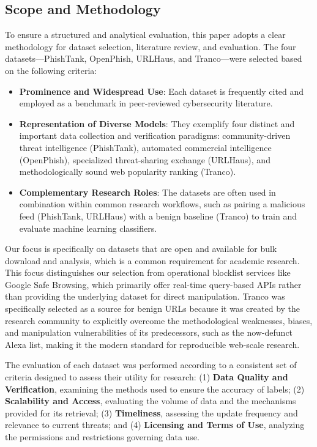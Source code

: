 \documentclass[journal,article,submit,pdftex,moreauthors]{Definitions/mdpi}
\begin{document}
\subsection{Scope and Methodology}

To ensure a structured and analytical evaluation, this paper adopts a clear methodology for dataset selection, literature review, and evaluation. The four datasets—PhishTank, OpenPhish, URLHaus, and Tranco—were selected based on the following criteria:

\begin{itemize}
\item \textbf{Prominence and Widespread Use}: Each dataset is frequently cited and employed as a benchmark in peer-reviewed cybersecurity literature.
\item \textbf{Representation of Diverse Models}: They exemplify four distinct and important data collection and verification paradigms: community-driven threat intelligence (PhishTank), automated commercial intelligence (OpenPhish), specialized threat-sharing exchange (URLHaus), and methodologically sound web popularity ranking (Tranco).
\item \textbf{Complementary Research Roles}: The datasets are often used in combination within common research workflows, such as pairing a malicious feed (PhishTank, URLHaus) with a benign baseline (Tranco) to train and evaluate machine learning classifiers.
\end{itemize}

Our focus is specifically on datasets that are open and available for bulk download and analysis, which is a common requirement for academic research. This focus distinguishes our selection from operational blocklist services like Google Safe Browsing, which primarily offer real-time query-based APIs rather than providing the underlying dataset for direct manipulation. Tranco was specifically selected as a source for benign URLs because it was created by the research community to explicitly overcome the methodological weaknesses, biases, and manipulation vulnerabilities of its predecessors, such as the now-defunct Alexa list, making it the modern standard for reproducible web-scale research.

The evaluation of each dataset was performed according to a consistent set of criteria designed to assess their utility for research: (1) \textbf{Data Quality and Verification}, examining the methods used to ensure the accuracy of labels; (2) \textbf{Scalability and Access}, evaluating the volume of data and the mechanisms provided for its retrieval; (3) \textbf{Timeliness}, assessing the update frequency and relevance to current threats; and (4) \textbf{Licensing and Terms of Use}, analyzing the permissions and restrictions governing data use.
\end{document}
